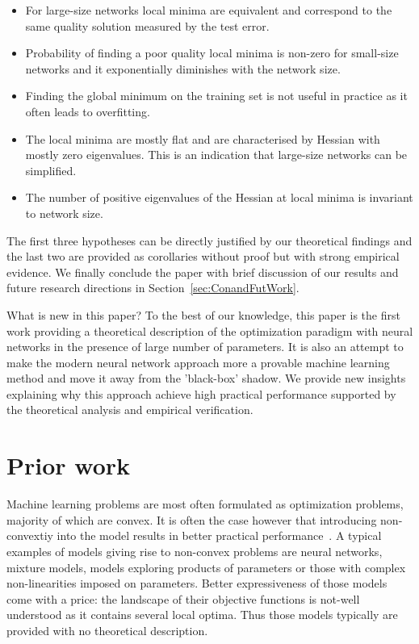\documentclass[twoside]{article}
\begin{document}
\begin{itemize}
\item For large-size networks local minima are equivalent and correspond to the same quality solution measured by the test error.
\vspace{-0.05in}
\item Probability of finding a poor quality local minima is non-zero for small-size networks and it exponentially diminishes with the network size.
\vspace{-0.05in}
\item Finding the global minimum on the training set is not useful in practice as it often leads to overfitting.
\vspace{-0.05in}
\item The local minima are mostly flat and are characterised by Hessian with mostly zero eigenvalues. This is an indication that large-size networks can be simplified.
\vspace{-0.05in}
\item The number of positive eigenvalues of the Hessian at local minima is invariant to network size.
\end{itemize}
\vspace{-0.05in}
The first three hypotheses can be directly justified by our theoretical findings and the last two are provided as corollaries without proof but with strong empirical evidence. We finally conclude the paper with brief discussion of our results and future research directions in Section~\ref{sec:ConandFutWork}. 

What is new in this paper? To the best of our knowledge, this paper is the first work providing a theoretical description of the optimization paradigm with neural networks in the presence of large number of parameters. It is also an attempt to make the modern neural network approach more a provable machine learning method and move it away from the 'black-box' shadow. We provide new insights explaining why this approach achieve high practical performance supported by the theoretical analysis and empirical verification.

\section{Prior work}
\label{sec:PriorWork}

Machine learning problems are most often formulated as optimization problems, majority of which are convex. It is often the case however that introducing non-convextiy into the model results in better practical performance~\cite{Do:2012:RBM:2503308.2503355, Bengio+chapter2007}. A typical examples of models giving rise to non-convex problems are neural networks, mixture models, models exploring products of parameters or those with complex non-linearities imposed on parameters. Better expressiveness of those models come with a price: the landscape of their objective functions is not-well understood as it contains several local optima. Thus those models typically are provided with no theoretical description. 
\end{document}
